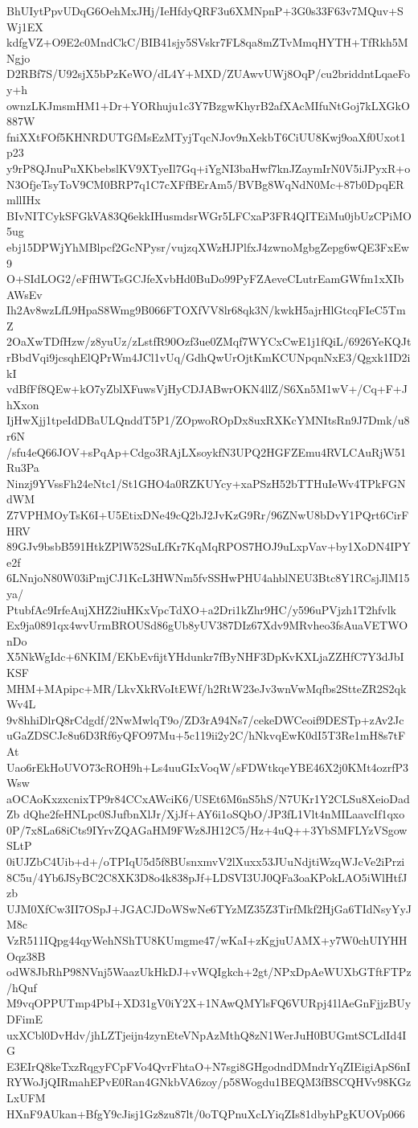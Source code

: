 BhUIytPpvUDqG6OehMxJHj/IeHfdyQRF3u6XMNpnP+3G0s33F63v7MQuv+SWj1EX
kdfgVZ+O9E2c0MndCkC/BIB41sjy5SVskr7FL8qa8mZTvMmqHYTH+TfRkh5MNgjo
D2RBf7S/U92sjX5bPzKeWO/dL4Y+MXD/ZUAwvUWj8OqP/cu2briddntLqaeFoy+h
ownzLKJmsmHM1+Dr+YORhuju1c3Y7BzgwKhyrB2afXAcMIfuNtGoj7kLXGkO887W
fniXXtFOf5KHNRDUTGfMsEzMTyjTqcNJov9nXekbT6CiUU8Kwj9oaXf0Uxot1p23
y9rP8QJnuPuXKbebslKV9XTyeIl7Gq+iYgNI3baHwf7knJZaymIrN0V5iJPyxR+o
N3OfjeTsyToV9CM0BRP7q1C7cXFfBErAm5/BVBg8WqNdN0Mc+87b0DpqERmllIHx
BIvNITCykSFGkVA83Q6ekkIHusmdsrWGr5LFCxaP3FR4QITEiMu0jbUzCPiMO5ug
ebj15DPWjYhMBlpcf2GcNPysr/vujzqXWzHJPlfxJ4zwnoMgbgZepg6wQE3FxEw9
O+SIdLOG2/eFfHWTsGCJfeXvbHd0BuDo99PyFZAeveCLutrEamGWfm1xXIbAWsEv
Ih2Av8wzLfL9HpaS8Wmg9B066FTOXfVV8lr68qk3N/kwkH5ajrHlGtcqFIeC5TmZ
2OaXwTDfHzw/z8yuUz/zLstfR90Ozf3ue0ZMqf7WYCxCwE1j1fQiL/6926YeKQJt
rBbdVqi9jcsqhElQPrWm4JCl1vUq/GdhQwUrOjtKmKCUNpqnNxE3/Qgxk1ID2ikI
vdBfFf8QEw+kO7yZblXFuwsVjHyCDJABwrOKN4llZ/S6Xn5M1wV+/Cq+F+JhXxon
IjHwXjj1tpeIdDBaULQnddT5P1/ZOpwoROpDx8uxRXKcYMNItsRn9J7Dmk/u8r6N
/sfu4eQ66JOV+sPqAp+Cdgo3RAjLXsoykfN3UPQ2HGFZEmu4RVLCAuRjW51Ru3Pa
Ninzj9YVssFh24eNtc1/St1GHO4a0RZKUYcy+xaPSzH52bTTHuIeWv4TPkFGNdWM
Z7VPHMOyTsK6I+U5EtixDNe49cQ2bJ2JvKzG9Rr/96ZNwU8bDvY1PQrt6CirFHRV
89GJv9bsbB591HtkZPlW52SuLfKr7KqMqRPOS7HOJ9uLxpVav+by1XoDN4IPYe2f
6LNnjoN80W03iPmjCJ1KcL3HWNm5fvSSHwPHU4ahblNEU3Btc8Y1RCsjJlM15ya/
PtubfAc9IrfeAujXHZ2iuHKxVpcTdXO+a2Dri1kZhr9HC/y596uPVjzh1T2hfvlk
Ex9ja0891qx4wvUrmBROUSd86gUb8yUV387DIz67Xdv9MRvheo3fsAuaVETWOnDo
X5NkWgIdc+6NKIM/EKbEvfijtYHdunkr7fByNHF3DpKvKXLjaZZHfC7Y3dJbIKSF
MHM+MApipc+MR/LkvXkRVoItEWf/h2RtW23eJv3wnVwMqfbs2StteZR2S2qkWv4L
9v8hhiDlrQ8rCdgdf/2NwMwlqT9o/ZD3rA94Ns7/cekeDWCeoif9DESTp+zAv2Jc
uGaZDSCJc8u6D3Rf6yQFO97Mu+5c119ii2y2C/hNkvqEwK0dI5T3Re1mH8s7tFAt
Uao6rEkHoUVO73cROH9h+Ls4uuGIxVoqW/sFDWtkqeYBE46X2j0KMt4ozrfP3Wsw
aOCAoKxzxcnixTP9r84CCxAWciK6/USEt6M6nS5hS/N7UKr1Y2CLSu8XeioDadZb
dQhe2feHNLpc0SJufbnXlJr/XjJf+AY6i1oSQbO/JP3fL1Vlt4nMILaavcIf1qxo
0P/7x8La68iCts9IYrvZQAGaHM9FWz8JH12C5/Hz+4uQ++3YbSMFLYzVSgowSLtP
0iUJZbC4Uib+d+/oTPIqU5d5f8BUsnxmvV2lXuxx53JUuNdjtiWzqWJcVe2iPrzi
8C5u/4Yb6JSyBC2C8XK3D8o4k838pJf+LDSVI3UJ0QFa3oaKPokLAO5iWlHtfJzb
UJM0XfCw3II7OSpJ+JGACJDoWSwNe6TYzMZ35Z3TirfMkf2HjGa6TIdNsyYyJM8c
VzR511IQpg44qyWehNShTU8KUmgme47/wKaI+zKgjuUAMX+y7W0chUIYHHOqz38B
odW8JbRhP98NVnj5WaazUkHkDJ+vWQIgkch+2gt/NPxDpAeWUXbGTftFTPz/hQuf
M9vqOPPUTmp4PbI+XD31gV0iY2X+1NAwQMYlsFQ6VURpj41lAeGnFjjzBUyDFimE
uxXCbl0DvHdv/jhLZTjeijn4zynEteVNpAzMthQ8zN1WerJuH0BUGmtSCLdId4IG
E3EIrQ8keTxzRqgyFCpFVo4QvrFhtaO+N7sgi8GHgodndDMndrYqZIEigiApS6nI
RYWoJjQIRmahEPvE0Ran4GNkbVA6zoy/p58Wogdu1BEQM3fBSCQHVv98KGzLxUFM
HXnF9AUkan+BfgY9cJisj1Gz8zu87lt/0oTQPnuXcLYiqZIs81dbyhPgKUOVp066
